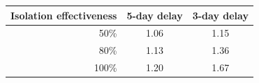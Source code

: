 \begin{tabular}{@{}rcc@{}}
\toprule
Isolation effectiveness & 5-day delay & 3-day delay \\
\midrule
50\% & 1.06 & 1.15 \\
80\% & 1.13 & 1.36 \\
100\% & 1.20 & 1.67 \\
\bottomrule
\end{tabular}
